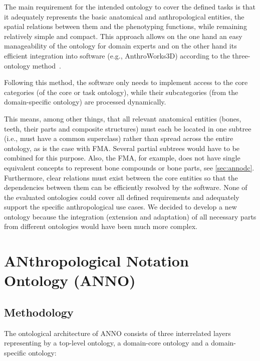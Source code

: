 \documentclass[sw]{iosart2x}
\newcommand{\aw}{AnthroWorks3D}
\begin{document}
The main requirement for the intended ontology to cover the defined tasks is that it adequately represents the basic anatomical and anthropological entities, the spatial relations between them and the phenotyping functions, while remaining relatively simple and compact.
This approach allows on the one hand an easy manageability of the ontology for domain experts and on the other hand its efficient integration into software (e.g., \aw{}) according to the three-ontology method~\citep{threeontologymethod}.

Following this method, the software only needs to implement access to the core categories (of the core or task ontology), while their subcategories (from the domain-specific ontology) are processed dynamically.

This means, among other things, that all relevant anatomical entities (bones, teeth, their parts and composite structures) must each be located in one subtree (i.e., must have a common superclass) rather than spread across the entire ontology, as is the case with FMA.
Several partial subtrees would have to be combined for this purpose.
Also, the FMA, for example, does not have single equivalent concepts to represent bone compounds or bone parts, see \cref{sec:annodc}.
Furthermore, clear relations must exist between the core entities so that the dependencies between them can be efficiently resolved by the software.
None of the evaluated ontologies could cover all defined requirements and adequately support the specific anthropological use cases.
We decided to develop a new ontology because the integration (extension and adaptation) of all necessary parts from different ontologies would have been much more complex.

\section{ANthropological Notation Ontology (ANNO)}\label{sec:anno}

\subsection{Methodology}\label{sec:methodology}
\iffalse
The ontological architecture of ANNO consists of three interrelated layers representing by a top-level ontology, a domain-core ontology and a domain-specific ontology:
\end{document}

